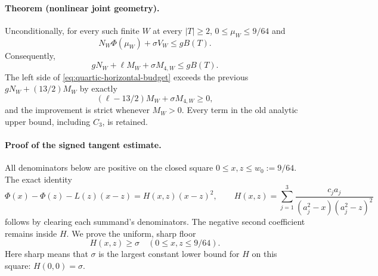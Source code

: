 \paragraph{Theorem (nonlinear joint geometry).}
Unconditionally, for every such finite \(W\) at every \(|T|\ge2\),
\(0\le\mu_W\le9/64\) and
\begin{equation}
 N_W\Phi(\mu_W)+\sigma V_W\le gB(T).
 \label{eq:nonlinear-horizontal-budget}
\end{equation}
Consequently,
\begin{equation}
 gN_W+\ell M_W+\sigma M_{4,W}\le gB(T).
 \label{eq:quartic-horizontal-budget}
\end{equation}
The left side of \eqref{eq:quartic-horizontal-budget} exceeds the
previous \(gN_W+(13/2)M_W\) by exactly
\[
 (\ell-13/2)M_W+\sigma M_{4,W}\ge0,
\]
and the improvement is strict whenever \(M_W>0\).
Every term in the old analytic upper bound, including \(C_3\), is retained.

\paragraph{Proof of the signed tangent estimate.}
All denominators below are positive on the closed square
\(0\le x,z\le w_0:=9/64\).  The exact identity
\begin{equation}
 \Phi(x)-\Phi(z)-L(z)(x-z)=H(x,z)(x-z)^2,
 \qquad
 H(x,z)=\sum_{j=1}^3
 \frac{c_ja_j}{(a_j^2-x)(a_j^2-z)^2}
 \label{eq:nonlinear-horizontal-tangent}
\end{equation}
follows by clearing each summand's denominators.  The negative second
coefficient remains inside \(H\).
We prove the uniform, sharp floor
\begin{equation}
 H(x,z)\ge\sigma\quad(0\le x,z\le9/64).
 \label{eq:nonlinear-horizontal-remainder-floor}
\end{equation}
Here sharp means that \(\sigma\) is the largest constant lower bound
for \(H\) on this square: \(H(0,0)=\sigma\).


